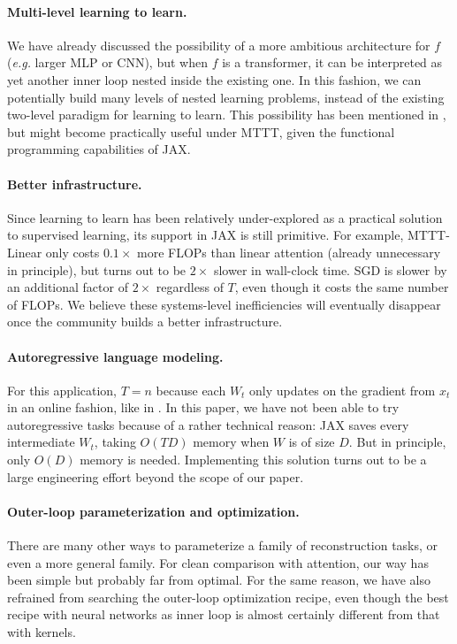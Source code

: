 \documentclass{article} %
\begin{document}
\paragraph{Multi-level learning to learn.}
We have already discussed the possibility of a more ambitious architecture for $f$ (\textit{e.g.} larger MLP or CNN), but when $f$ is a transformer, it can be interpreted as yet another inner loop nested inside the existing one.
In this fashion, we can potentially build many levels of nested learning problems, instead of the existing two-level paradigm for learning to learn.
This possibility has been mentioned in \cite{irie2021going}, but might become practically useful under MTTT, given the functional programming capabilities of JAX.

\paragraph{Better infrastructure.}
Since learning to learn has been relatively under-explored as a practical solution to supervised learning, its support in JAX is still primitive.
For example, MTTT-Linear only costs $0.1\times$ more FLOPs than linear attention (already unnecessary in principle), but turns out to be $2\times$ slower in wall-clock time.
SGD is slower by an additional factor of $2\times$ regardless of $T$, even though it costs the same number of FLOPs.
We believe these systems-level inefficiencies will eventually disappear once the community builds a better infrastructure.

\paragraph{Autoregressive language modeling.}
For this application, $T=n$ because each $W_t$ only updates on the gradient from $x_t$ in an online fashion, like in \cite{wang2023test}.
In this paper, we have not been able to try autoregressive tasks because of a rather technical reason:
JAX saves every intermediate $W_t$, taking $O(TD)$ memory when $W$ is of size $D$.
But in principle, only $O(D)$ memory is needed. 
Implementing this solution turns out to be a large engineering effort beyond the scope of our paper.

\paragraph{Outer-loop parameterization and optimization.}
There are many other ways to parameterize a family of reconstruction tasks, or even a more general family.
For clean comparison with attention, our way has been simple but probably far from optimal.
For the same reason, we have also refrained from searching the outer-loop optimization recipe, even though the best recipe with neural networks as inner loop is almost certainly different from that with kernels.
\end{document}
